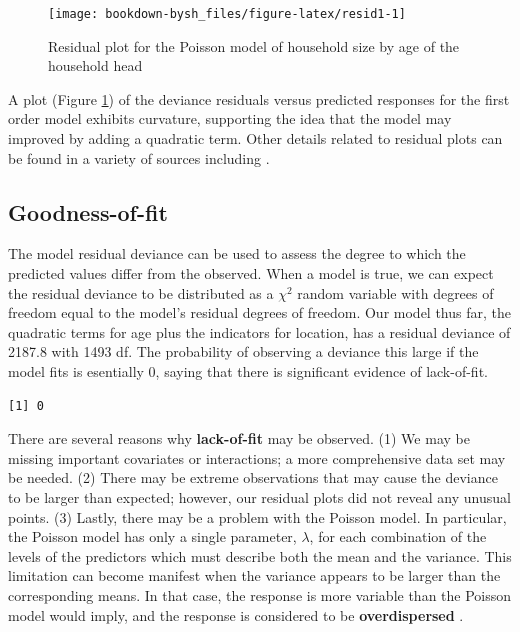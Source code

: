 \documentclass[
]{krantz}
\newenvironment{Shaded}{\begin{snugshade}}{\end{snugshade}}
\newcommand{\CommentTok}[1]{\textcolor[rgb]{0.37,0.37,0.37}{\textit{#1}}}
\newcommand{\DecValTok}[1]{\textcolor[rgb]{0.06,0.06,0.06}{#1}}
\newcommand{\KeywordTok}[1]{\textcolor[rgb]{0.27,0.27,0.27}{\textbf{#1}}}
\newcommand{\NormalTok}[1]{#1}
\newcommand{\OperatorTok}[1]{\textcolor[rgb]{0.43,0.43,0.43}{\textbf{#1}}}
\begin{document}
\begin{figure}

{\centering \texttt{[image: bookdown-bysh\_files/figure-latex/resid1-1]} 

}

\caption{Residual plot for the Poisson model of household size by age of the household head}\label{fig:resid1}
\end{figure}

A plot (Figure \ref{fig:resid1}) of the deviance residuals versus predicted responses for the first order model exhibits curvature, supporting the idea that the model may improved by adding a quadratic term. Other details related to residual plots can be found in a variety of sources including \citet{McCullagh1989}.

\hypertarget{sec-PoisGOF}{%
\subsection{Goodness-of-fit}\label{sec-PoisGOF}}

The model residual deviance can be used to assess the degree to which the predicted values differ from the observed. When a model is true, we can expect the residual deviance to be distributed as a \(\chi^2\) random variable with degrees of freedom equal to the model's residual degrees of freedom. Our model thus far, the quadratic terms for age plus the indicators for location, has a residual deviance of 2187.8 with 1493 df. The probability of observing a deviance this large if the model fits is esentially 0, saying that there is significant evidence of lack-of-fit.

\begin{Shaded}
\end{Shaded}

\begin{verbatim}
[1] 0
\end{verbatim}

There are several reasons why \textbf{lack-of-fit}  may be observed. (1) We may be missing important covariates or interactions; a more comprehensive data set may be needed. (2) There may be extreme observations that may cause the deviance to be larger than expected; however, our residual plots did not reveal any unusual points. (3) Lastly, there may be a problem with the Poisson model. In particular, the Poisson model has only a single parameter, \(\lambda\), for each combination of the levels of the predictors which must describe both the mean and the variance. This limitation can become manifest when the variance appears to be larger than the corresponding means. In that case, the response is more variable than the Poisson model would imply, and the response is considered to be \textbf{overdispersed} .
\end{document}
